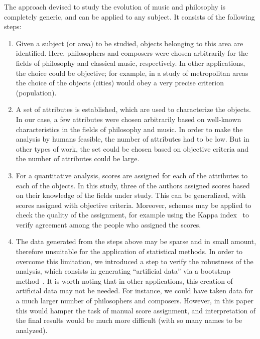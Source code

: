 \documentclass[
 aip,
 jmp,
 amsmath,amssymb,
 reprint,
]{revtex4-1}
\begin{document}
The approach devised to study the evolution of music and philosophy is
completely generic, and can be applied to any subject. It consists of
the following steps:

\begin{enumerate}
  \item{Given a subject (or area) to be studied, objects belonging to
    this area are identified. Here, philosophers and composers were
    chosen arbitrarily for the fields of philosophy and classical
    music, respectively. In other applications, the choice could be
    objective; for example, in a study of metropolitan areas the
    choice of the objects (cities) would obey a very precise criterion
    (population).}

  \item{A set of attributes is established, which are used to
    characterize the objects. In our case, a few attributes were
    chosen arbitrarily based on well-known characteristics in the
    fields of philosophy and music. In order to make the analysis by
    humans feasible, the number of attributes had to be low. But in
    other types of work, the set could be chosen based on objective
    criteria and the number of attributes could be large.}

  \item{For a quantitative analysis, scores are assigned for each of
    the attributes to each of the objects. In this study, three of the
    authors assigned scores based on their knowledge of the fields
    under study. This can be generalized, with scores assigned with
    objective criteria. Moreover, schemes may be applied to check the
    quality of the assignment, for example using the Kappa
    index~\cite{Cohen1960} to verify agreement among the people who
    assigned the scores.}

  \item{The data generated from the steps above may be sparse and in
    small amount, therefore unsuitable for the application of
    statistical methods. In order to overcome this limitation, we
    introduced a step to verify the robustness of the analysis, which
    consists in generating ``artificial data'' via a bootstrap
    method~\cite{Boos2003}. It is worth noting that in other
    applications, this creation of artificial data may not be
    needed. For instance, we could have taken data for a much larger
    number of philosophers and composers. However, in this paper this
    would hamper the task of manual score assignment, and
    interpretation of the final results would be much more difficult
    (with so many names to be analyzed).}


\end{enumerate}
\end{document}
